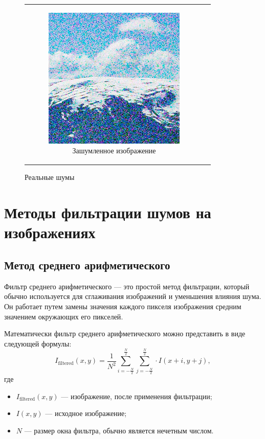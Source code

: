 \begin{figure}[h!]
\begin{tabular}{cc}
\begin{subfigure}{0.45\textwidth}
      \includegraphics[width=\linewidth]{inc/analysis/noises/real.png}
      \caption{Зашумленное изображение}
    \end{subfigure} \\
  \end{tabular}
  \caption{Реальные шумы}
  \label{fig:real_noise}
\end{figure}

\section{Методы фильтрации шумов на изображениях}

\subsection{Метод среднего арифметического}

Фильтр среднего арифметического --- это простой метод фильтрации, который обычно используется для сглаживания изображений и уменьшения влияния шума. Он работает путем замены значения каждого пикселя изображения средним значением окружающих его пикселей\cite{meanfilter}.

Математически фильтр среднего арифметического можно представить в виде следующей формулы:
\begin{equation}
    I_{\text{filtered}}(x,y) = \frac{1}{N^2} \sum_{i=-\frac{N}{2}}^{\frac{N}{2}} \sum_{j=-\frac{N}{2}}^{\frac{N}{2}} \cdot I(x+i,y+j),
\end{equation}
где
\begin{itemize}
    \item $I_{\text{filtered}}(x,y)$ --- изображение, после применения фильтрации;
    \item $I(x,y)$ --- исходное изображение;
    \item $N$ --- размер окна фильтра, обычно является нечетным числом.
\end{itemize}


